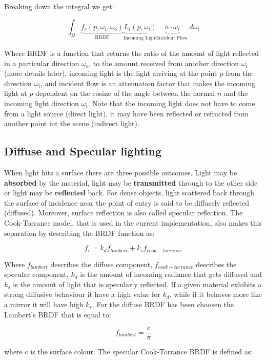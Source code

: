 \noindent Breaking down the integral we get:

\begin{equation}
\int_\Omega \underbrace{f_r(p,\omega_i,\omega_o)}_\text{BRDF}\underbrace{L_i(p,\omega_i)}_\text{Incoming Light}\underbrace{n\cdot\omega_i}_\text{Incident Flow}\ d\omega_i
\end{equation}

Where BRDF is a function that returns the ratio of the amount of light reflected in a particular direction $\omega_o$, to the
amount received from another direction $\omega_i$ (more details later), incoming light is the light arriving at the point p
from the direction $\omega_i$, and incident flow is an attenuation factor that makes the incoming light at $p$
dependent on the cosine of the angle between the normal $n$ and the incoming light direction $\omega_i$. Note that the
incoming light does not have to come from a light source (direct light), it may have been reflected or refracted from another
point int the scene (indirect light).

\subsection{Diffuse and Specular lighting}
When light hits a surface there are three possible outcomes. Light may be \textbf{absorbed} by the material, light may be
\textbf{transmitted} through to the other side or light may be \textbf{reflected} back. For dense objects, light scattered
back through the surface of incidence near the point of entry is said to be diffusely reflected (diffused). Moreover, surface
reflection is also called specular reflection. The Cook-Torrance model, that is used in the current implementation,
also makes this separation by describing the BRDF function as:

$$f_r = k_d f_{lambert} + k_s f_{cook-torrance}$$

Where $f_{lambert}$ describes the diffuse component, $f_{cook-torrance}$ describes the specular component, $k_d$ is the amount
of incoming radiance that gets diffused and $k_s$ is the amount of light that is specularly reflected. If a given material
exhibits a strong diffusive behaviour it have a high value for $k_d$, while if it behaves more like a mirror it will have high $k_s$.
For the diffuse BRDF has been choosen the Lambert's BRDF that is equal to:

$$f_{lambert} = \frac{c}{\pi}$$

where c is the surface colour. The specular Cook-Torrance BRDF is defined as:

